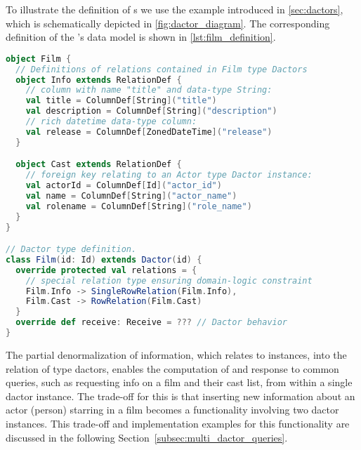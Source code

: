 To illustrate the definition of s we use the example introduced in \cref{sec:dactors}, which is schematically depicted in \cref{fig:dactor_diagram}.
The corresponding definition of the 's data model is shown in \cref{lst:film_definition}.

\begin{minipage}{1.0\linewidth}
\begin{lstlisting}[caption=Film Dactor type definition using the presented framework., label=lst:film_definition, language=Scala]
object Film {
  // Definitions of relations contained in Film type Dactors
  object Info extends RelationDef {
    // column with name "title" and data-type String:
    val title = ColumnDef[String]("title")
    val description = ColumnDef[String]("description")
    // rich datetime data-type column:
    val release = ColumnDef[ZonedDateTime]("release")
  }

  object Cast extends RelationDef {
    // foreign key relating to an Actor type Dactor instance:
    val actorId = ColumnDef[Id]("actor_id")
    val name = ColumnDef[String]("actor_name")
    val rolename = ColumnDef[String]("role_name")
  }
} 

// Dactor type definition.
class Film(id: Id) extends Dactor(id) {
  override protected val relations = {
    // special relation type ensuring domain-logic constraint
    Film.Info -> SingleRowRelation(Film.Info),
    Film.Cast -> RowRelation(Film.Cast)
  }
  override def receive: Receive = ??? // Dactor behavior
}
\end{lstlisting}
\end{minipage}
%


The partial denormalization of information, which relates to  instances, into the  \gls{relation} of  type \glspl{dactor},
enables the computation of and response to common queries, such as requesting info on a film and their cast list, from within a single \gls{dactor} instance.
The trade-off for this is that inserting new information about an actor (person) starring in a film becomes a functionality involving two \gls{dactor} instances.
This trade-off and implementation examples for this functionality are discussed in the following Section~\ref{subsec:multi_dactor_queries}.

